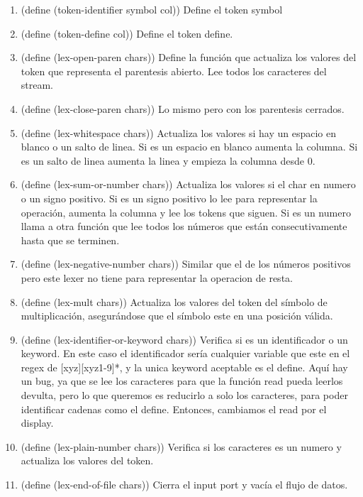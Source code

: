 \documentclass{article}
\begin{document}
\begin{enumerate}
    \item (define (token-identifier symbol col))
    Define el token symbol
    \item (define (token-define col))
    Define el token define.
    \item (define (lex-open-paren chars))
    Define la función que actualiza los valores del token que representa el parentesis abierto. Lee todos los caracteres del stream. 
    \item (define (lex-close-paren chars))
    Lo mismo pero con los parentesis cerrados.
    \item (define (lex-whitespace chars))
    Actualiza los valores si hay un espacio en blanco o un salto de linea. Si es un espacio en blanco aumenta la columna. Si es un salto de linea aumenta la linea y empieza la columna desde 0.
    \item (define (lex-sum-or-number chars))
    Actualiza los valores si el char en numero o un signo positivo. Si es un signo positivo lo lee para representar la operación, aumenta la columna y lee los tokens que siguen. Si es un numero llama a otra función que lee todos los números que están consecutivamente hasta que se terminen.

    \item (define (lex-negative-number chars))
    Similar que el de los números positivos pero este lexer no tiene para representar la operacion de resta.

    \item (define (lex-mult chars))
    Actualiza los valores del token del símbolo de multiplicación, asegurándose que el símbolo este en una posición válida.

    \item (define (lex-identifier-or-keyword chars))
    Verifica si es un identificador o un keyword. En este caso el identificador sería cualquier variable que este en el regex de [xyz][xyz1-9]*, y la unica keyword aceptable es el define. Aquí hay un bug, ya que se lee los caracteres para que la función read pueda leerlos devulta, pero lo que queremos es reducirlo a solo los caracteres, para poder identificar cadenas como el define. Entonces, cambiamos el read por el display.

    \item (define (lex-plain-number chars))
    Verifica si los caracteres es un numero y actualiza los valores del token.

    \item (define (lex-end-of-file chars))
    Cierra el input port y vacía el flujo de datos.


\end{enumerate}
\end{document}
